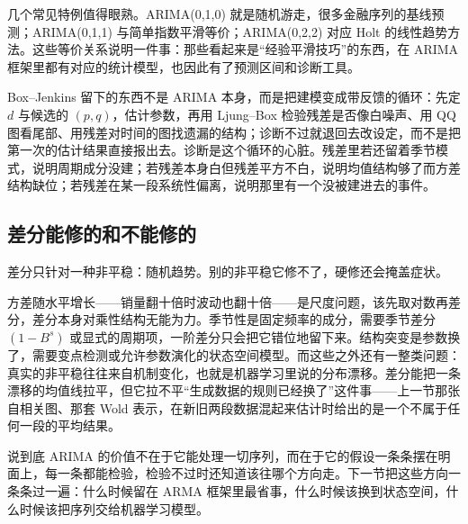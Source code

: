 几个常见特例值得眼熟。ARIMA(0,1,0) 就是随机游走，很多金融序列的基线预测；ARIMA(0,1,1) 与简单指数平滑等价；ARIMA(0,2,2) 对应 Holt 的线性趋势方法。这些等价关系说明一件事：那些看起来是``经验平滑技巧''的东西，在 ARIMA 框架里都有对应的统计模型，也因此有了预测区间和诊断工具。

Box--Jenkins 留下的东西不是 ARIMA 本身，而是把建模变成带反馈的循环：先定 \(d\) 与候选的 \((p,q)\)，估计参数，再用 Ljung--Box 检验残差是否像白噪声、用 QQ 图看尾部、用残差对时间的图找遗漏的结构；诊断不过就退回去改设定，而不是把第一次的估计结果直接报出去。诊断是这个循环的心脏。残差里若还留着季节模式，说明周期成分没建；若残差本身白但残差平方不白，说明均值结构够了而方差结构缺位；若残差在某一段系统性偏离，说明那里有一个没被建进去的事件。

\subsection{差分能修的和不能修的}

差分只针对一种非平稳：随机趋势。别的非平稳它修不了，硬修还会掩盖症状。

方差随水平增长——销量翻十倍时波动也翻十倍——是尺度问题，该先取对数再差分，差分本身对乘性结构无能为力。季节性是固定频率的成分，需要季节差分 \((1-B^s)\) 或显式的周期项，一阶差分只会把它错位地留下来。结构突变是参数换了，需要变点检测或允许参数演化的状态空间模型。而这些之外还有一整类问题：真实的非平稳往往来自机制变化，也就是机器学习里说的分布漂移。差分能把一条漂移的均值线拉平，但它拉不平``生成数据的规则已经换了''这件事——上一节那张自相关图、那套 Wold 表示，在新旧两段数据混起来估计时给出的是一个不属于任何一段的平均结果。

说到底 ARIMA 的价值不在于它能处理一切序列，而在于它的假设一条条摆在明面上，每一条都能检验，检验不过时还知道该往哪个方向走。下一节把这些方向一条条过一遍：什么时候留在 ARMA 框架里最省事，什么时候该换到状态空间，什么时候该把序列交给机器学习模型。
